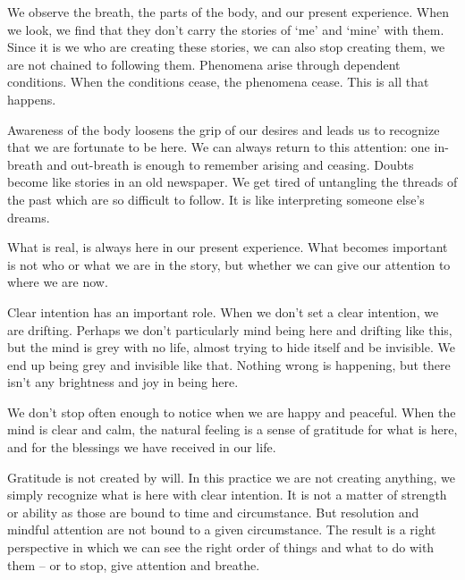 
We observe the breath, the parts of the body, and our present
experience. When we look, we find that they don't carry the stories of
`me' and `mine' with them. Since it is we who are creating these
stories, we can also stop creating them, we are not chained to following
them. Phenomena arise through dependent conditions. When the conditions
cease, the phenomena cease. This is all that happens.

Awareness of the body loosens the grip of our desires and leads us to
recognize that we are fortunate to be here. We can always return to this
attention: one in-breath and out-breath is enough to remember arising
and ceasing. Doubts become like stories in an old newspaper. We get
tired of untangling the threads of the past which are so difficult to
follow. It is like interpreting someone else's dreams.

What is real, is always here in our present experience. What becomes
important is not who or what we are in the story, but whether we can
give our attention to where we are now.

Clear intention has an important role. When we don't set a clear
intention, we are drifting. Perhaps we don't particularly mind being
here and drifting like this, but the mind is grey with no life, almost
trying to hide itself and be invisible. We end up being grey and
invisible like that. Nothing wrong is happening, but there isn't any
brightness and joy in being here.

We don't stop often enough to notice when we are happy and peaceful.
When the mind is clear and calm, the natural feeling is a sense of
gratitude for what is here, and for the blessings we have received in
our life.

\enlargethispage*{\baselineskip}

Gratitude is not created by will. In this practice we are not creating
anything, we simply recognize what is here with clear intention. It is
not a matter of strength or ability as those are bound to time and
circumstance. But resolution and mindful attention are not bound to a
given circumstance. The result is a right perspective in which we can
see the right order of things and what to do with them -- or to stop,
give attention and breathe.
